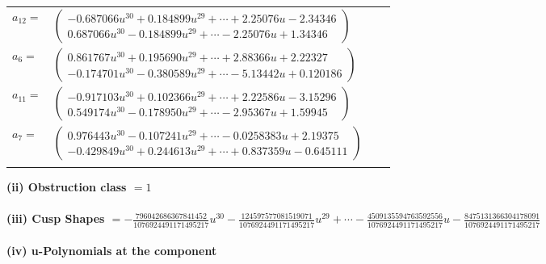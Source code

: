 \documentclass[1p]{elsarticle_modified}
\theoremstyle{definition}
\begin{document}
\begin{tabular}{m{7pt} m{180pt} m{7pt} m{180pt} }
\flushright $a_{12}=$&$\begin{pmatrix}-0.687066 u^{30}+0.184899 u^{29}+\cdots+2.25076 u-2.34346\\0.687066 u^{30}-0.184899 u^{29}+\cdots-2.25076 u+1.34346\end{pmatrix}$ \\
\flushright $a_{6}=$&$\begin{pmatrix}0.861767 u^{30}+0.195690 u^{29}+\cdots+2.88366 u+2.22327\\-0.174701 u^{30}-0.380589 u^{29}+\cdots-5.13442 u+0.120186\end{pmatrix}$ \\
\flushright $a_{11}=$&$\begin{pmatrix}-0.917103 u^{30}+0.102366 u^{29}+\cdots+2.22586 u-3.15296\\0.549174 u^{30}-0.178950 u^{29}+\cdots-2.95367 u+1.59945\end{pmatrix}$ \\
\flushright $a_{7}=$&$\begin{pmatrix}0.976443 u^{30}-0.107241 u^{29}+\cdots-0.0258383 u+2.19375\\-0.429849 u^{30}+0.244613 u^{29}+\cdots+0.837359 u-0.645111\end{pmatrix}$\\&\end{tabular}
\flushleft \textbf{(ii) Obstruction class $= 1$}\\~\\
\flushleft \textbf{(iii) Cusp Shapes $= -\frac{796042686367841452}{1076924491171495217} u^{30}-\frac{124597577081519071}{1076924491171495217} u^{29}+\cdots-\frac{4509135594763592556}{1076924491171495217} u-\frac{8475131366304178091}{1076924491171495217}$}\\~\\
\newpage\renewcommand{\arraystretch}{1}
\flushleft \textbf{(iv) u-Polynomials at the component}\newline \\
\end{document}
